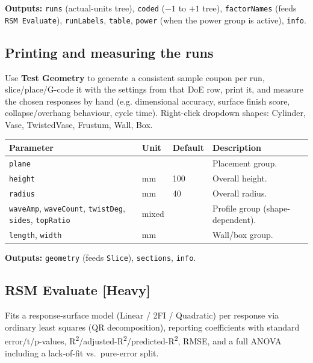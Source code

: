 \documentclass[11pt]{article}
\newcommand{\param}[1]{\texttt{#1}}
\newcommand{\heavy}{\textbf{[Heavy]}}
\begin{document}
\textbf{Outputs:} \param{runs} (actual-units tree), \param{coded} ($-1$
to $+1$ tree), \param{factorNames} (feeds \param{RSM Evaluate}),
\param{runLabels}, \param{table}, \param{power} (when the power group is
active), \param{info}.

\subsection{Printing and measuring the runs}

Use \textbf{Test Geometry} to generate a consistent sample coupon
per run, slice/place/G-code it with the settings from that DoE row,
print it, and measure the chosen responses by hand (e.g. dimensional
accuracy, surface finish score, collapse/overhang behaviour, cycle
time). Right-click dropdown shapes: Cylinder, Vase, TwistedVase,
Frustum, Wall, Box.

\begin{longtable}{@{}p{3.2cm}p{2.0cm}p{2.0cm}p{6.4cm}@{}}
\toprule
\textbf{Parameter} & \textbf{Unit} & \textbf{Default} & \textbf{Description} \\
\midrule
\endhead
\param{plane} & & & Placement group. \\
\param{height} & mm & 100 & Overall height. \\
\param{radius} & mm & 40 & Overall radius. \\
\param{waveAmp}, \param{waveCount}, \param{twistDeg}, \param{sides}, \param{topRatio} & mixed & & Profile group (shape-dependent). \\
\param{length}, \param{width} & mm & & Wall/box group. \\
\bottomrule
\end{longtable}

\textbf{Outputs:} \param{geometry} (feeds \param{Slice}),
\param{sections}, \param{info}.

\subsection{RSM Evaluate \heavy{}}

Fits a response-surface model (Linear / 2FI / Quadratic) per response
via ordinary least squares (QR decomposition), reporting coefficients
with standard error/t/p-values, R\textsuperscript{2}/adjusted-R\textsuperscript{2}/predicted-R\textsuperscript{2},
RMSE, and a full ANOVA including a lack-of-fit vs.\ pure-error split.
\end{document}
